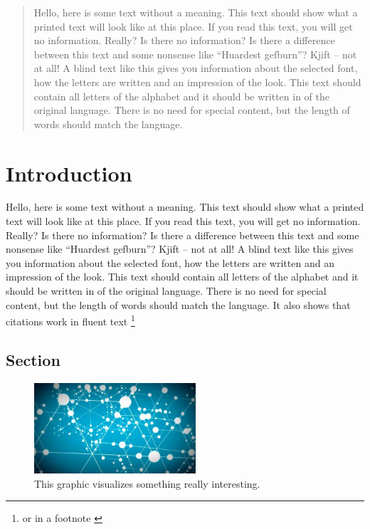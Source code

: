 \documentclass{CSSHThesis}
\begin{document}
\def \TypeofThesis{Master Thesis}
\def \TitleofThesis{Something interesting and meaningful}
\def \AuthorofThesis{Your Name}
\def \FirstSupervisor{Your first Supervisor}
\def \SecondSupervisor{Your second Supervisor}
\def \Advisor{Advisor}

\newpage
\thispagestyle{plain}
\begin{abstract}
	Hello, here is some text without a meaning. This text should show what a printed text will look like
at this place. If you read this text, you will get no information. Really? Is there no information?
Is there a difference between this text and some nonsense like “Huardest gefburn”? Kjift – not at
all! A blind text like this gives you information about the selected font, how the letters are written
and an impression of the look. This text should contain all letters of the alphabet and it should be
written in of the original language. There is no need for special content, but the length of words
should match the language.
\end{abstract}
\cleardoublepage
{} %
\chapter{Introduction}
\thispagestyle{empty}
Hello, here is some text without a meaning. This text should show what a printed text will look like
at this place. If you read this text, you will get no information. Really? Is there no information?
Is there a difference between this text and some nonsense like “Huardest gefburn”? Kjift – not at
all! A blind text like this gives you information about the selected font, how the letters are written
and an impression of the look. This text should contain all letters of the alphabet and it should be
written in of the original language. There is no need for special content, but the length of words
should match the language.
It also shows that citations work in fluent text \cite{lit:koblergraphisomorphism}
\footnote{or in a footnote \cite{groheparameterized}}
\section{Section}
\begin{figure}[htb!]
	\centering
	\includegraphics[width=6cm]{img/thing.jpg}
	\caption{This graphic visualizes something really interesting.}
	\label{fig:dummy}
  \end{figure}
\end{document}
